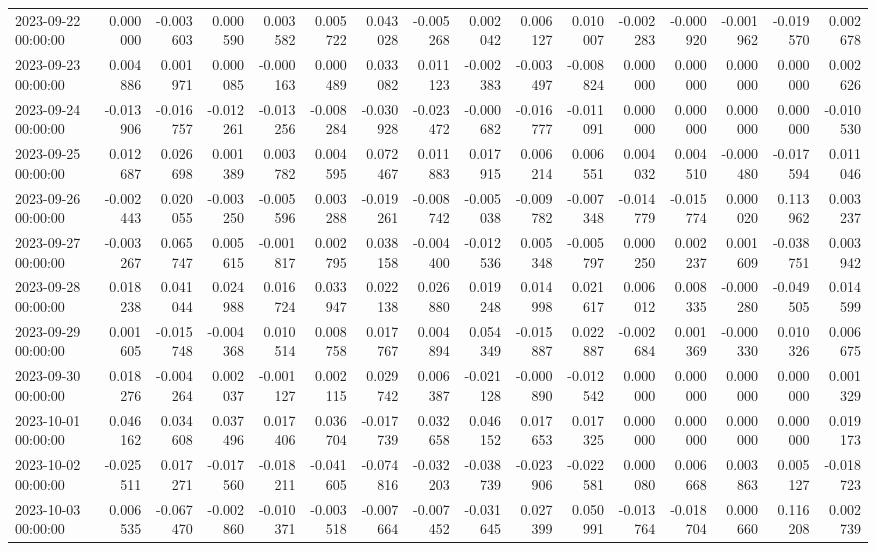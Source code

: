 \begin{tabular}{lrrrrrrrrrrrrrrr}
2023-09-22 00:00:00 & 0.000000 & -0.003603 & 0.000590 & 0.003582 & 0.005722 & 0.043028 & -0.005268 & 0.002042 & 0.006127 & 0.010007 & -0.002283 & -0.000920 & -0.001962 & -0.019570 & 0.002678 \\
2023-09-23 00:00:00 & 0.004886 & 0.001971 & 0.000085 & -0.000163 & 0.000489 & 0.033082 & 0.011123 & -0.002383 & -0.003497 & -0.008824 & 0.000000 & 0.000000 & 0.000000 & 0.000000 & 0.002626 \\
2023-09-24 00:00:00 & -0.013906 & -0.016757 & -0.012261 & -0.013256 & -0.008284 & -0.030928 & -0.023472 & -0.000682 & -0.016777 & -0.011091 & 0.000000 & 0.000000 & 0.000000 & 0.000000 & -0.010530 \\
2023-09-25 00:00:00 & 0.012687 & 0.026698 & 0.001389 & 0.003782 & 0.004595 & 0.072467 & 0.011883 & 0.017915 & 0.006214 & 0.006551 & 0.004032 & 0.004510 & -0.000480 & -0.017594 & 0.011046 \\
2023-09-26 00:00:00 & -0.002443 & 0.020055 & -0.003250 & -0.005596 & 0.003288 & -0.019261 & -0.008742 & -0.005038 & -0.009782 & -0.007348 & -0.014779 & -0.015774 & 0.000020 & 0.113962 & 0.003237 \\
2023-09-27 00:00:00 & -0.003267 & 0.065747 & 0.005615 & -0.001817 & 0.002795 & 0.038158 & -0.004400 & -0.012536 & 0.005348 & -0.005797 & 0.000250 & 0.002237 & 0.001609 & -0.038751 & 0.003942 \\
2023-09-28 00:00:00 & 0.018238 & 0.041044 & 0.024988 & 0.016724 & 0.033947 & 0.022138 & 0.026880 & 0.019248 & 0.014998 & 0.021617 & 0.006012 & 0.008335 & -0.000280 & -0.049505 & 0.014599 \\
2023-09-29 00:00:00 & 0.001605 & -0.015748 & -0.004368 & 0.010514 & 0.008758 & 0.017767 & 0.004894 & 0.054349 & -0.015887 & 0.022887 & -0.002684 & 0.001369 & -0.000330 & 0.010326 & 0.006675 \\
2023-09-30 00:00:00 & 0.018276 & -0.004264 & 0.002037 & -0.001127 & 0.002115 & 0.029742 & 0.006387 & -0.021128 & -0.000890 & -0.012542 & 0.000000 & 0.000000 & 0.000000 & 0.000000 & 0.001329 \\
2023-10-01 00:00:00 & 0.046162 & 0.034608 & 0.037496 & 0.017406 & 0.036704 & -0.017739 & 0.032658 & 0.046152 & 0.017653 & 0.017325 & 0.000000 & 0.000000 & 0.000000 & 0.000000 & 0.019173 \\
2023-10-02 00:00:00 & -0.025511 & 0.017271 & -0.017560 & -0.018211 & -0.041605 & -0.074816 & -0.032203 & -0.038739 & -0.023906 & -0.022581 & 0.000080 & 0.006668 & 0.003863 & 0.005127 & -0.018723 \\
2023-10-03 00:00:00 & 0.006535 & -0.067470 & -0.002860 & -0.010371 & -0.003518 & -0.007664 & -0.007452 & -0.031645 & 0.027399 & 0.050991 & -0.013764 & -0.018704 & 0.000660 & 0.116208 & 0.002739 \\

\end{tabular}

